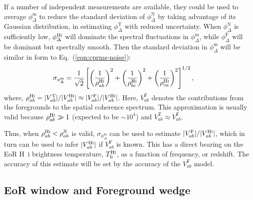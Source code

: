 \documentclass[
reprint,
superscriptaddress,
amsmath,
amssymb,
aps,
prd
]{revtex4-1}
\begin{document}
If a number of independent measurements are available, they could be used to average $\phi_\Delta^\textrm{m}$ to reduce the standard deviation of $\phi_\Delta^\textrm{N}$ by taking advantage of its Gaussian distribution, in estimating $\phi_\Delta^\textrm{T}$ with reduced uncertainty. When $\phi_\Delta^\textrm{N}$ is sufficiently low, $\phi_\Delta^\textrm{H{\sc i}}$ will dominate the spectral fluctuations in $\phi_\Delta^\textrm{m}$, while $\phi_\Delta^\textrm{F}$ will be dominant but spectrally smooth. Then the standard deviation in $\phi_\Delta^\textrm{m}$ will be similar in form to Eq.~(\ref{eqn:cprms-noise}):
\begin{align}
  \sigma_{\phi_\Delta^\textrm{m}} &= \frac{1}{\sqrt{2}}\left[\left(\frac{1}{\rho_{ab}^\textrm{H{\sc i}}}\right)^2 + \left(\frac{1}{\rho_{bc}^\textrm{H{\sc i}}}\right)^2 + \left(\frac{1}{\rho_{ca}^\textrm{H{\sc i}}}\right)^2\right]^{1/2}, \label{eqn:cprms-EoR}
\end{align}
where, $\rho_{ab}^\textrm{H{\sc i}} = |V_{ab}^\textrm{T}|/|V_{ab}^\textrm{H{\sc i}}| \approx |V_{ab}^\textrm{F}|/|V_{ab}^\textrm{H{\sc i}}|$. Here, $V_{ab}^\textrm{F}$ denotes the contributions from the foregrounds to the spatial coherence spectrum. This approximation is usually valid because $\rho_{ab}^\textrm{H{\sc i}} \gg 1$ (expected to be $\sim 10^4$) and $V_{ab}^\textrm{T} \approx V_{ab}^\textrm{F}$. 

Thus, when $\rho_{ab}^\textrm{H{\sc i}} < \rho_{ab}^\textrm{N}$ is valid, $\sigma_{\phi_\Delta^\textrm{m}}$ can be used to estimate $|V_{ab}^\textrm{F}|/|V_{ab}^\textrm{H{\sc i}}|$, which in turn can be used to infer $|V_{ab}^\textrm{H{\sc i}}|$ if $V_{ab}^\textrm{F}$ is known. This has a direct bearing on the EoR H~{\sc i} brightness temperature, $T_\textrm{b}^\textrm{H{\sc i}}$, as a function of frequency, or redshift. The accuracy of this estimate will be set by the accuracy of the $V_{ab}^\textrm{F}$ model.


\subsection{EoR window and Foreground wedge}\label{sec:cp-FG-wedge}
\end{document}
